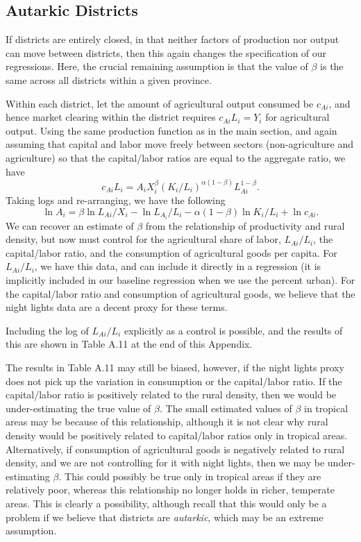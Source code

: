 \documentclass[11pt]{article}
\begin{document}
\subsection{Autarkic Districts}
If districts are entirely closed, in that neither factors of production nor output can move between districts, then this again changes the specification of our regressions. Here, the crucial remaining assumption is that the value of $\beta$ is the same across all districts within a given province. 

Within each district, let the amount of agricultural output consumed be $c_{Ai}$, and hence market clearing within the district requires $c_{Ai} L_i = Y_i$ for agricultural output. Using the same production function as in the main section, and again assuming that capital and labor move freely between sectors (non-agriculture and agriculture) so that the capital/labor ratios are equal to the aggregate ratio, we have
\begin{equation}
    c_{Ai} L_i = A_i X_i^{\beta} \left(K_i/L_i\right)^{\alpha(1-\beta)} L_{Ai}^{1-\beta}. \nonumber
\end{equation}
Taking logs and re-arranging, we have the following
\begin{equation}
    \ln A_i = \beta \ln L_{Ai}/X_i - \ln L_{A_i}/L_i - \alpha(1-\beta) \ln K_{i}/L_{i} + \ln c_{Ai}. \nonumber
\end{equation}
We can recover an estimate of $\beta$ from the relationship of productivity and rural density, but now must control for the agricultural share of labor, $L_{Ai}/L_i$, the capital/labor ratio, and the consumption of agricultural goods per capita. For $L_{Ai}/L_i$, we have this data, and can include it directly in a regression (it is implicitly included in our baseline regression when we use the percent urban). For the capital/labor ratio and consumption of agricultural goods, we believe that the night lights data are a decent proxy for these terms.

Including the log of $L_{Ai}/L_i$ explicitly as a control is possible, and the results of this are shown in Table A.11 at the end of this Appendix.

The results in Table A.11 may still be biased, however, if the night lights proxy does not pick up the variation in consumption or the capital/labor ratio. If the capital/labor ratio is positively related to the rural density, then we would be under-estimating the true value of $\beta$. The small estimated values of $\beta$ in tropical areas may be because of this relationship, although it is not clear why rural density would be positively related to capital/labor ratios only in tropical areas. Alternatively, if consumption of agricultural goods is negatively related to rural density, and we are not controlling for it with night lights, then we may be under-estimating $\beta$. This could possibly be true only in tropical areas if they are relatively poor, whereas this relationship no longer holds in richer, temperate areas. This is clearly a possibility, although recall that this would only be a problem if we believe that districts are \textit{autarkic}, which may be an extreme assumption.
\end{document}
